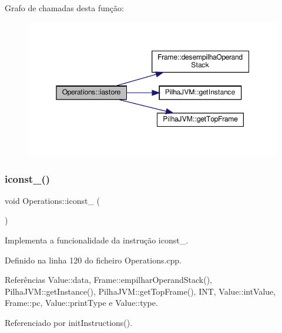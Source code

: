 Grafo de chamadas desta função\+:
\nopagebreak
\begin{figure}[H]
\begin{center}
\leavevmode
\includegraphics[width=350pt]{classOperations_aeec162356a6792b1d0ba385f75f443b1_cgraph}
\end{center}
\end{figure}
\mbox{\label{classOperations_a89879486791daebe6659b96688465c9d}} 
\subsubsection{\texorpdfstring{iconst\+\_()}{iconst\_0()}}
{\footnotesize\ttfamily void Operations\+::iconst\+\_ (\begin{DoxyParamCaption}{ }\end{DoxyParamCaption})\hspace{0.3cm}{\ttfamily [private]}}



Implementa a funcionalidade da instrução iconst\+\_. 



Definido na linha 120 do ficheiro Operations.\+cpp.



Referências Value\+::data, Frame\+::empilhar\+Operand\+Stack(), Pilha\+J\+V\+M\+::get\+Instance(), Pilha\+J\+V\+M\+::get\+Top\+Frame(), I\+NT, Value\+::int\+Value, Frame\+::pc, Value\+::print\+Type e Value\+::type.



Referenciado por init\+Instructions().

